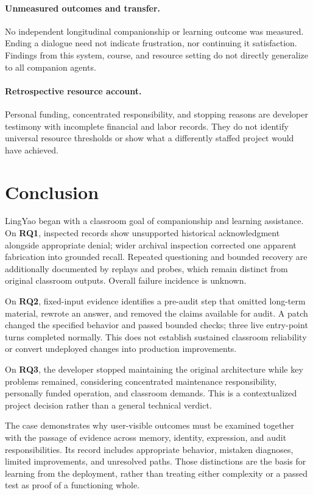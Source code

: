 \documentclass[11pt,a4paper]{article}
\begin{document}
\paragraph{Unmeasured outcomes and transfer.}
No independent longitudinal companionship or learning outcome was measured. Ending a dialogue need not indicate frustration, nor continuing it satisfaction. Findings from this system, course, and resource setting do not directly generalize to all companion agents.

\paragraph{Retrospective resource account.}
Personal funding, concentrated responsibility, and stopping reasons are developer testimony with incomplete financial and labor records. They do not identify universal resource thresholds or show what a differently staffed project would have achieved.

\section{Conclusion}
LingYao began with a classroom goal of companionship and learning assistance. On \textbf{RQ1}, inspected records show unsupported historical acknowledgment alongside appropriate denial; wider archival inspection corrected one apparent fabrication into grounded recall. Repeated questioning and bounded recovery are additionally documented by replays and probes, which remain distinct from original classroom outputs. Overall failure incidence is unknown.

On \textbf{RQ2}, fixed-input evidence identifies a pre-audit step that omitted long-term material, rewrote an answer, and removed the claims available for audit. A patch changed the specified behavior and passed bounded checks; three live entry-point turns completed normally. This does not establish sustained classroom reliability or convert undeployed changes into production improvements.

On \textbf{RQ3}, the developer stopped maintaining the original architecture while key problems remained, considering concentrated maintenance responsibility, personally funded operation, and classroom demands. This is a contextualized project decision rather than a general technical verdict.

The case demonstrates why user-visible outcomes must be examined together with the passage of evidence across memory, identity, expression, and audit responsibilities. Its record includes appropriate behavior, mistaken diagnoses, limited improvements, and unresolved paths. Those distinctions are the basis for learning from the deployment, rather than treating either complexity or a passed test as proof of a functioning whole.
\end{document}
